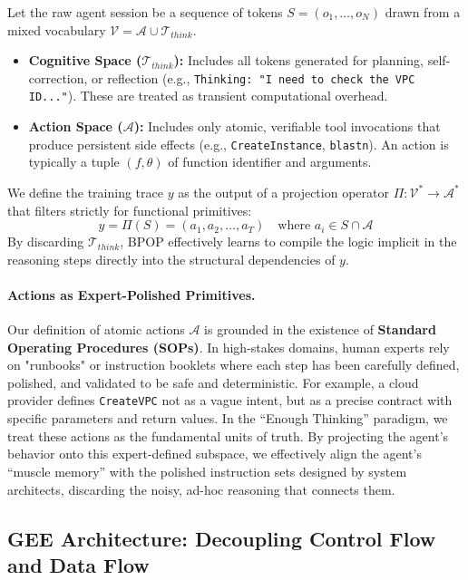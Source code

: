 \documentclass{article}
\theoremstyle{plain}
\theoremstyle{definition}
\theoremstyle{remark}
\begin{document}
Let the raw agent session be a sequence of tokens $S = (o_1, \dots, o_N)$ drawn from a mixed vocabulary $\mathcal{V} = \mathcal{A} \cup \mathcal{T}_{think}$.
\begin{itemize}
    \item \textbf{Cognitive Space ($\mathcal{T}_{think}$):} Includes all tokens generated for planning, self-correction, or reflection (e.g., \texttt{Thinking: "I need to check the VPC ID..."}). These are treated as transient computational overhead.
    \item \textbf{Action Space ($\mathcal{A}$):} Includes only atomic, verifiable tool invocations that produce persistent side effects (e.g., \texttt{CreateInstance}, \texttt{blastn}). An action is typically a tuple $(f, \theta)$ of function identifier and arguments.
\end{itemize}

We define the training trace $y$ as the output of a projection operator $\Pi: \mathcal{V}^* \to \mathcal{A}^*$ that filters strictly for functional primitives:
\begin{equation}
    y = \Pi(S) = (a_1, a_2, \dots, a_T) \quad \text{where } a_i \in S \cap \mathcal{A}
\end{equation}
By discarding $\mathcal{T}_{think}$, BPOP effectively learns to compile the logic implicit in the reasoning steps directly into the structural dependencies of $y$.
\
\paragraph{Actions as Expert-Polished Primitives.}
Our definition of atomic actions $\mathcal{A}$ is grounded in the existence of \textbf{Standard Operating Procedures (SOPs)}. 
In high-stakes domains, human experts rely on "runbooks" or instruction booklets where each step has been carefully defined, polished, and validated to be safe and deterministic. 
For example, a cloud provider defines \texttt{CreateVPC} not as a vague intent, but as a precise contract with specific parameters and return values. 
In the ``Enough Thinking'' paradigm, we treat these actions as the fundamental units of truth. By projecting the agent's behavior onto this expert-defined subspace, we effectively align the agent's ``muscle memory'' with the polished instruction sets designed by system architects, discarding the noisy, ad-hoc reasoning that connects them.




\subsection{GEE Architecture: Decoupling Control Flow and Data Flow}
\label{subsec:gee-arch}
\end{document}
